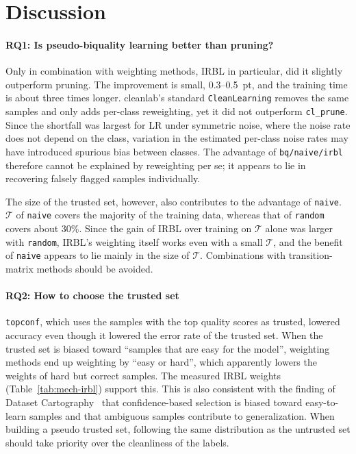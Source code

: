 \documentclass[a4paper,10pt]{article}
\newcommand{\method}[1]{\texttt{#1}}
\newcommand{\cl}{\textsf{cleanlab}}
\begin{document}
\section{Discussion}\label{sec:discussion}

\paragraph{RQ1: Is pseudo-biquality learning better than pruning?}
Only in combination with weighting methods, IRBL in particular, did it slightly outperform pruning.
The improvement is small, 0.3--0.5~pt, and the training time is about three times longer.
\cl{}'s standard \texttt{CleanLearning} removes the same samples and only adds per-class reweighting, yet it did not outperform \method{cl\_prune}.
Since the shortfall was largest for LR under symmetric noise, where the noise rate does not depend on the class, variation in the estimated per-class noise rates may have introduced spurious bias between classes.
The advantage of \method{bq/naive/irbl} therefore cannot be explained by reweighting per se; it appears to lie in recovering falsely flagged samples individually.

The size of the trusted set, however, also contributes to the advantage of \method{naive}.
$\mathcal{T}$ of \method{naive} covers the majority of the training data, whereas that of \method{random} covers about 30\%.
Since the gain of IRBL over training on $\mathcal{T}$ alone was larger with \method{random}, IRBL's weighting itself works even with a small $\mathcal{T}$, and the benefit of \method{naive} appears to lie mainly in the size of $\mathcal{T}$.
Combinations with transition-matrix methods should be avoided.

\paragraph{RQ2: How to choose the trusted set}
\method{topconf}, which uses the samples with the top quality scores as trusted, lowered accuracy even though it lowered the error rate of the trusted set.
When the trusted set is biased toward ``samples that are easy for the model'', weighting methods end up weighting by ``easy or hard'', which apparently lowers the weights of hard but correct samples.
The measured IRBL weights (Table~\ref{tab:mech-irbl}) support this.
This is also consistent with the finding of Dataset Cartography~\cite{swayamdipta2020cartography} that confidence-based selection is biased toward easy-to-learn samples and that ambiguous samples contribute to generalization.
When building a pseudo trusted set, following the same distribution as the untrusted set should take priority over the cleanliness of the labels.
\end{document}
